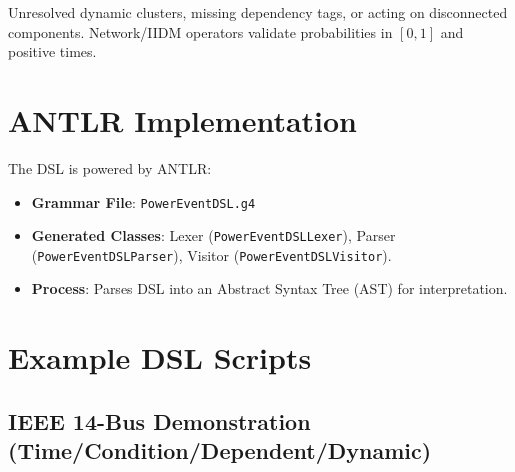 \documentclass[12pt]{article}
\begin{document}
Unresolved dynamic clusters, missing dependency tags, or acting on disconnected components. Network/IIDM operators
validate probabilities in $[0,1]$ and positive times.

\section{ANTLR Implementation}

The DSL is powered by ANTLR:
\begin{itemize}
  \item \textbf{Grammar File}: \texttt{PowerEventDSL.g4}
  \item \textbf{Generated Classes}: Lexer (\texttt{PowerEventDSLLexer}), Parser (\texttt{PowerEventDSLParser}),
        Visitor (\texttt{PowerEventDSLVisitor}).
  \item \textbf{Process}: Parses DSL into an Abstract Syntax Tree (AST) for interpretation.
\end{itemize}

\section{Example DSL Scripts}

\subsection{IEEE 14-Bus Demonstration (Time/Condition/Dependent/Dynamic)}
\end{document}
